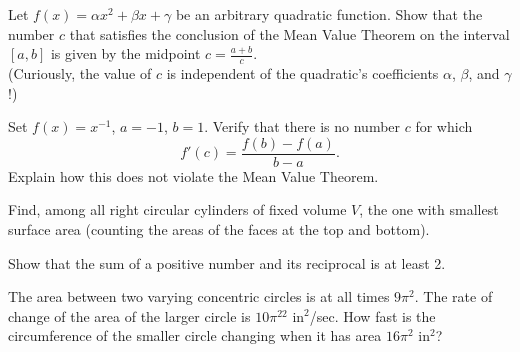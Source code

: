 \documentclass[12pt,letterpaper]{hmcpset}
\begin{document}

\begin{problem}[1]
  Let $f(x) = \alpha x^2+\beta x + \gamma$ be an arbitrary quadratic function. Show that the number $c$ that satisfies the conclusion of the Mean Value Theorem on the interval $[a, b]$ is given by the midpoint $c = \frac{a+b}{c}$. \\

  (Curiously, the value of $c$ is independent of the quadratic's coefficients $\alpha$, $\beta$, and $\gamma$!)
\end{problem}

\begin{solution}
\end{solution}
\pagebreak
\begin{problem}[2]
  Set $f(x) = x^{-1}$, $a = -1$, $b = 1$. Verify that there is no number $c$ for which
  \[ f'(c) = \frac{f(b) - f(a)}{b - a}. \]
  Explain how this does not violate the Mean Value Theorem.
\end{problem}
\begin{solution}

\end{solution}
\pagebreak
\begin{problem}[3]
Find, among all right circular cylinders of fixed volume $V$, the one with smallest surface area (counting the areas of the faces at the top and bottom).
\end{problem}
\begin{solution}

\end{solution}
\pagebreak
\begin{problem}[4]
  Show that the sum of a positive number and its reciprocal is at least 2.
\end{problem}
\begin{solution}

\end{solution}
\pagebreak
\begin{problem}[5]
  The area between two varying concentric circles is at all times $9\pi^2$.
  The rate of change of the area of the larger circle is $10\pi^22 \text{ in}^2$/sec.
  How fast is the circumference of the smaller circle changing when it has area $16\pi^2 \text{ in}^2$?
\end{problem}
\begin{solution}

\end{solution}
\pagebreak
\end{document}
